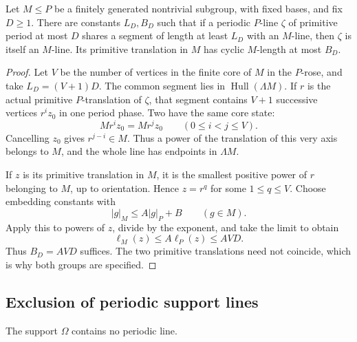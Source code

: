 \begin{lemma}
\label{exp:carrier-period}
Let $M\le P$ be a finitely generated nontrivial subgroup, with fixed
bases, and fix $D\ge1$. There are constants $L_D,B_D$ such that if
a periodic $P$-line $\zeta$ of primitive period at most $D$ shares
a segment of length at least $L_D$ with an $M$-line, then $\zeta$
is itself an $M$-line. Its primitive translation in $M$ has cyclic
$M$-length at most $B_D$.
\end{lemma}

\begin{proof}
Let $V$ be the number of vertices in the finite core of $M$ in the
$P$-rose, and take $L_D=(V+1)D$. The common segment lies in
$\operatorname{Hull}(\Lambda M)$. If $r$ is the actual primitive
$P$-translation of $\zeta$, that segment contains $V+1$ successive
vertices $r^i z_0$ in one period phase. Two have the same core state:
\[
 M r^i z_0=M r^j z_0\qquad(0\le i<j\le V).
\]
Cancelling $z_0$ gives $r^{j-i}\in M$. Thus a power of the
translation of this very axis belongs to $M$, and the whole line
has endpoints in $\Lambda M$.

If $z$ is its primitive translation in $M$, it is the smallest
positive power of $r$ belonging to $M$, up to orientation. Hence
$z=r^q$ for some $1\le q\le V$. Choose embedding constants with
\[
 |g|_M\le A|g|_P+B\qquad(g\in M).
\]
Apply this to powers of $z$, divide by the exponent, and take the
limit to obtain
\begin{equation}
 \ell_M(z)\le A\ell_P(z)\le AVD.
 \label{exp:carrier-period-bound}
\end{equation}
Thus $B_D=AVD$ suffices. The two primitive translations need not
coincide, which is why both groups are specified.
\end{proof}

\subsection{Exclusion of periodic support lines}

\begin{proposition}
\label{exp:no-periodic}
The support $\Omega$ contains no periodic line.
\end{proposition}

